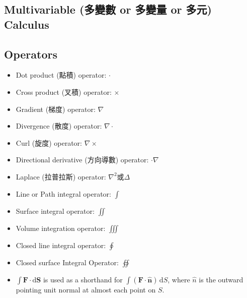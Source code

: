 \documentclass[a4paper,12pt]{report}
\begin{document}
\begin{itemize}
\begin{itemize}
\section{Multivariable (多變數 or 多變量 or 多元) Calculus}
\subsection{Operators}
\begin{itemize}
\item Dot product (點積) operator: $\cdot$
\item Cross product (叉積) operator: $\times$
\item Gradient (梯度) operator: $\nabla$
\item Divergence (散度) operator: $\nabla \cdot$
\item Curl (旋度) operator: $\nabla \times$
\item Directional derivative (方向導數) operator: $\cdot\nabla$
\item Laplace (拉普拉斯) operator: $\nabla^2$或$\Delta$
\item Line or Path integral operator: $\int$
\item Surface integral operator: $\iint$
\item Volume integration operator: $\iiint$
\item Closed line integral operator: $\oint$
\item Closed surface Integral Operator: $\oiint$
\item $\int\mathbf{F}\cdot\mathrm{d}\mathbf{S}$ is used as a shorthand for $\int(\mathbf{F}\cdot\mathbf{\hat{n}})\,\mathrm{d}S$, where $\hat{n}$ is the outward pointing unit normal at almost each point on $S$.
\end{itemize}

\end{itemize}
\end{itemize}
\end{document}
